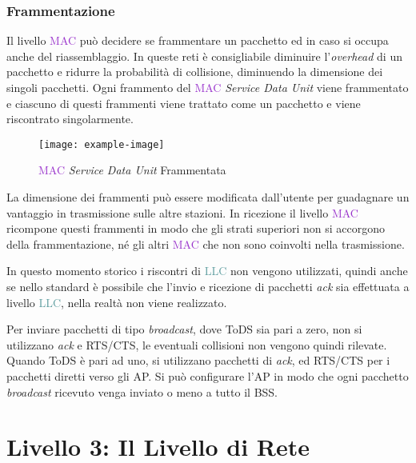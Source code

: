 \documentclass{article}
\numberwithin{equation}{subsection}
\begin{document}
\subsubsection{Frammentazione}

Il livello \textcolor{DarkOrchid}{MAC} può decidere se frammentare un pacchetto ed in caso si occupa anche del riassemblaggio. In queste reti è consigliabile diminuire l'\textit{overhead} di un pacchetto e ridurre la 
probabilità di collisione, diminuendo la dimensione dei singoli pacchetti. 
Ogni frammento del \textcolor{DarkOrchid}{MAC} \textit{Service Data Unit} viene frammentato e ciascuno di questi frammenti viene trattato come un pacchetto e viene riscontrato singolarmente. 

\begin{figure}[H]%
    \centering%
    \texttt{[image: example-image]}%
    \caption{\textcolor{DarkOrchid}{MAC} \textit{Service Data Unit} Frammentata}%
\end{figure}

La dimensione dei frammenti può essere modificata dall'utente per guadagnare un vantaggio in trasmissione sulle altre stazioni. 
In ricezione il livello \textcolor{DarkOrchid}{MAC} ricompone questi frammenti in modo che gli strati superiori non si accorgono della frammentazione, né gli altri \textcolor{DarkOrchid}{MAC} che non 
sono coinvolti nella trasmissione. 

In questo momento storico i riscontri di \textcolor{CadetBlue}{LLC} non vengono utilizzati, quindi anche se nello standard è possibile che l'invio e ricezione di pacchetti \textit{ack} sia effettuata a 
livello \textcolor{CadetBlue}{LLC}, nella realtà non viene realizzato. 

Per inviare pacchetti di tipo \textit{broadcast}, dove ToDS sia pari a zero, non si utilizzano \textit{ack} e \textcolor{Dandelion}{RTS}/\textcolor{Dandelion}{CTS}, le eventuali collisioni non vengono quindi rilevate. Quando 
ToDS è pari ad uno, si utilizzano pacchetti di \textit{ack}, ed \textcolor{Dandelion}{RTS}/\textcolor{Dandelion}{CTS} per i pacchetti diretti verso gli \textcolor{PineGreen}{AP}. Si può configurare l'\textcolor{PineGreen}{AP} in modo che ogni pacchetto 
\textit{broadcast} ricevuto venga inviato o meno a tutto il \textcolor{Rhodamine}{BSS}. 


\clearpage

\section{Livello 3: Il Livello di Rete}
\end{document}
